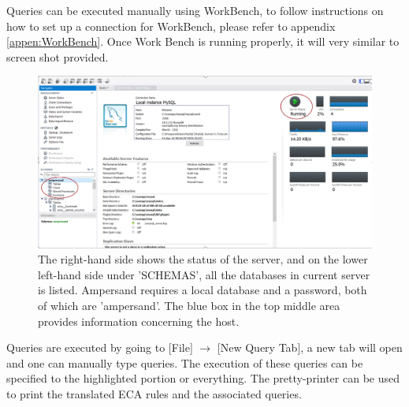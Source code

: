 Queries can be executed manually using WorkBench, to follow instructions on how 
to set up a connection for WorkBench, please refer to appendix 
\ref{appen:WorkBench}. Once Work Bench is running properly, it will very 
similar to screen shot provided.
\begin{figure}[!h]
    \includegraphics[width=\textwidth]{images/WorkBench}
    \caption{\footnotesize{The right-hand side shows the status of the server, 
    and on the lower left-hand side under 'SCHEMAS', all the databases in 
    current server is listed. Ampersand requires a local database and a 
    password, both of which are 'ampersand'. The blue box in the top middle 
    area provides information concerning the host. }}
\end{figure}

Queries are executed by going to [File] $\rightarrow$ [New Query Tab], a new 
tab will open and one can manually type queries. The execution of these queries 
can be specified to the highlighted portion or everything. The pretty-printer 
can be used to print the translated ECA rules and the associated queries.

